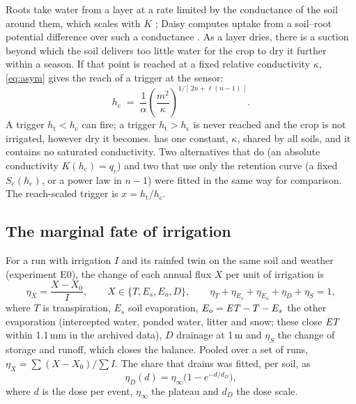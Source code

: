\documentclass[review,12pt,authoryear]{elsarticle}
\newcommand{\hc}{h_{\mathrm{c}}}
\newcommand{\htr}{h_{\mathrm{t}}}
\begin{document}
Roots take water from a layer at a rate limited by the conductance of the soil around them, which scales with $K$ \citep{Gardner1960,Carminati2020}; Daisy computes uptake from a soil--root potential difference over such a conductance \citep{Hansen1990,Abrahamsen2000}. As a layer dries, there is a suction beyond which the soil delivers too little water for the crop to dry it further within a season. If that point is reached at a fixed relative conductivity $\kappa$, \cref{eq:asym} gives the reach of a trigger at the sensor:
\begin{equation}
\hc \;=\; \frac{1}{\alpha}\left(\frac{m^{2}}{\kappa}\right)^{1/[\,2n+\ell(n-1)\,]}.
\label{eq:hc}
\end{equation}
A trigger $\htr<\hc$ can fire; a trigger $\htr>\hc$ is never reached and the crop is not irrigated, however dry it becomes.  has one constant, $\kappa$, shared by all soils, and it contains no saturated conductivity. Two alternatives that do (an absolute conductivity $K(\hc)=q_c$) and two that use only the retention curve (a fixed $S_e(\hc)$, or a power law in $n-1$) were fitted in the same way for comparison. The reach-scaled trigger is $x=\htr/\hc$.

\subsection{The marginal fate of irrigation}
For a run with irrigation $I$ and its rainfed twin on the same soil and weather (experiment E0), the change of each annual flux $X$ per unit of irrigation is
\begin{equation}
\eta_X=\frac{X-X_{0}}{I},\qquad X\in\{T,E_s,E_o,D\},\qquad \eta_T+\eta_{E_s}+\eta_{E_o}+\eta_D+\eta_S=1,
\label{eq:eta}
\end{equation}
where $T$ is transpiration, $E_s$ soil evaporation, $E_o=\mathit{ET}-T-E_s$ the other evaporation (intercepted water, ponded water, litter and snow; these close $\mathit{ET}$ within 1.1\,mm in the archived data), $D$ drainage at 1\,m and $\eta_S$ the change of storage and runoff, which closes the balance. Pooled over a set of runs, $\eta_X=\sum(X-X_0)/\sum I$. The share that drains was fitted, per soil, as
\begin{equation}
\eta_D(d)=\eta_\infty\bigl(1-e^{-d/d_D}\bigr),
\label{eq:dose}
\end{equation}
where $d$ is the dose per event, $\eta_\infty$ the plateau and $d_D$ the dose scale.
\end{document}
